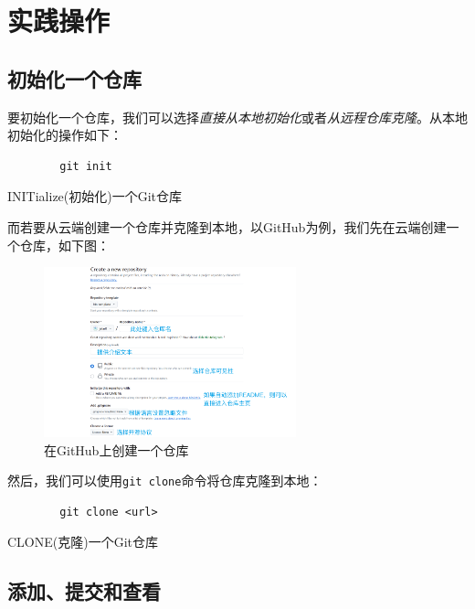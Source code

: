 \section{实践操作}

\subsection{初始化一个仓库}

要初始化一个仓库，我们可以选择\textit{直接从本地初始化}或者\textit{从远程仓库克隆}。从本地初始化的操作如下：

\begin{listing}[!htpb]
    \begin{verbatim}
        git init
    \end{verbatim}
    \caption{INITialize(初始化)一个Git仓库}
\end{listing}

而若要从云端创建一个仓库并克隆到本地，以GitHub为例，我们先在云端创建一个仓库，如下图：

\begin{figure}[!h]
    \centering
    \includegraphics[width=0.65\textwidth]{figures/github-create-repo.png}
    \caption{在GitHub上创建一个仓库}
    \label{fig:github-create-repo}
\end{figure}

然后，我们可以使用\verb|git clone|命令将仓库克隆到本地：

\begin{listing}[!htpb]
    \begin{verbatim}
        git clone <url>
    \end{verbatim}
    \caption{CLONE(克隆)一个Git仓库}
\end{listing}

\subsection{添加、提交和查看}

